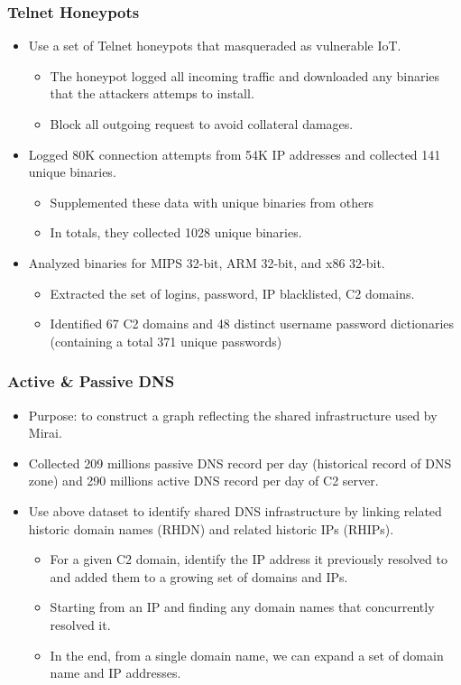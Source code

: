\documentclass{beamer}
\begin{document}
\begin{frame}
	\frametitle{Telnet Honeypots}
	\begin{itemize}
		\item Use a set of Telnet honeypots that masqueraded as vulnerable IoT. 
		\begin{itemize}
			\item The honeypot logged all incoming traffic and downloaded any binaries that the attackers attemps to install.
			\item Block all outgoing request to avoid collateral damages.
		\end{itemize}
		\item Logged 80K connection attempts from 54K IP addresses and collected 141 unique binaries.
		\begin{itemize}
			\item Supplemented these data with unique binaries from others
			\item In totals, they collected 1028 unique binaries.
		\end{itemize}
		\item Analyzed binaries for MIPS 32-bit, ARM 32-bit, and x86 32-bit.
		\begin{itemize}
			\item Extracted the set of logins, password, IP blacklisted, C2 domains.
			\item Identified 67 C2 domains and 48 distinct username password dictionaries (containing a total 371 unique passwords)
		\end{itemize}
	\end{itemize}
\end{frame}

\begin{frame}
	\frametitle{Active \& Passive DNS}
	\begin{itemize}
		\item Purpose: to construct a graph reflecting the shared infrastructure used by Mirai.
		\item Collected 209 millions passive DNS record per day (historical record of DNS zone) and 290 millions active DNS record per day of C2 server.
		\item Use above dataset to identify shared DNS infrastructure by linking related historic domain names (RHDN) and related historic IPs (RHIPs).
		\begin{itemize}
			\item For a given C2 domain, identify the IP address it previously resolved to and added them to a growing set of domains and IPs.
			\item Starting from an IP and finding any domain names that concurrently resolved it.
			\item In the end, from a single domain name, we can expand a set of domain name and IP addresses.
		\end{itemize}
	\end{itemize}
\end{frame}
\end{document}
